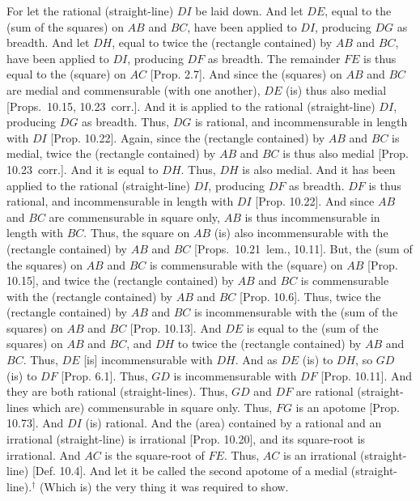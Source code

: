 \begin{Parallel}{}{}
{For let the rational (straight-line) $DI$ be laid down. And let $DE$, equal
to the (sum of the squares) on $AB$ and $BC$, have been applied to
$DI$, producing $DG$ as breadth. And let $DH$, equal to twice the
(rectangle contained) by $AB$ and $BC$, have been applied to $DI$,
producing $DF$ as breadth. The remainder $FE$ is thus equal to the
(square) on $AC$ [Prop. 2.7]. And since the
(squares) on $AB$ and $BC$ are medial and commensurable (with one another), $DE$ (is) thus also medial [Props.~10.15, 10.23~corr.]. And it is applied to the
rational (straight-line) $DI$, producing $DG$ as breadth. Thus, $DG$
is rational, and incommensurable in length with $DI$ [Prop. 10.22].  Again, since the (rectangle contained)
by $AB$ and $BC$ is medial, twice the (rectangle contained) by $AB$
and $BC$ is thus also medial [Prop. 10.23~corr.]. 
And it is equal to $DH$. Thus, $DH$ is also medial. And it has been
applied to the rational (straight-line) $DI$, producing $DF$ as breadth.
$DF$ is thus rational, and incommensurable in length with $DI$
[Prop. 10.22].  And since $AB$ and $BC$ are commensurable in square only, $AB$ is thus incommensurable in length
with $BC$. Thus, the square on $AB$ (is) also incommensurable
with the (rectangle contained) by $AB$ and $BC$ [Props.~10.21~lem.,
10.11]. But, the (sum of the squares) on $AB$ and $BC$  is commensurable with the (square) on $AB$  [Prop. 10.15], and twice the (rectangle contained)
by $AB$ and $BC$ is commensurable with the (rectangle contained)
by $AB$ and $BC$ [Prop. 10.6]. Thus, twice
the (rectangle contained) by $AB$ and $BC$ is incommensurable
with the (sum of the squares) on $AB$ and $BC$ [Prop. 10.13]. And $DE$ is equal
to the (sum of the squares) on $AB$ and $BC$, and $DH$ to
twice the (rectangle contained) by $AB$ and $BC$. Thus, $DE$
[is] incommensurable with $DH$. And as $DE$ (is) to $DH$, so
$GD$ (is) to $DF$ [Prop. 6.1]. Thus,
$GD$ is incommensurable with $DF$ [Prop. 10.11]. And they are both rational (straight-lines). Thus, $GD$ and $DF$ are rational (straight-lines which are)
commensurable in square only.
Thus, $FG$ is an apotome [Prop. 10.73]. 
And $DI$ (is) rational. And the (area) contained by a rational and
an irrational (straight-line) is irrational [Prop. 10.20], and its square-root 
is irrational. And $AC$ is the square-root of $FE$. Thus, $AC$ is an
irrational (straight-line) [Def. 10.4]. And
let it be called the second apotome of a medial (straight-line).$^\dag$
(Which is) the very thing it
was required to show.}
\end{Parallel}


